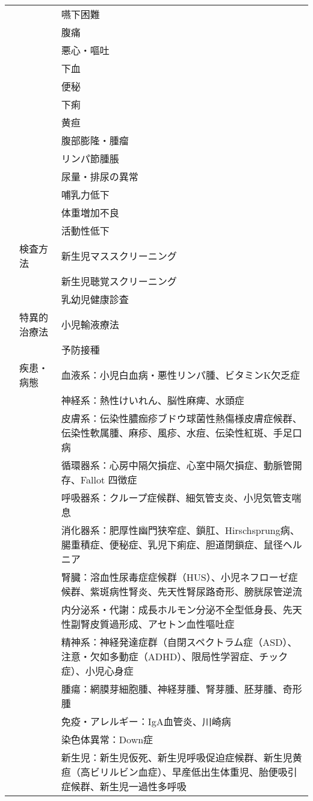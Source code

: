 \documentclass[
]{ltjsarticle}
\begin{document}
\begin{xltabular}{\linewidth}{XXX}
 &  & 嚥下困難 \\
 &  & 腹痛 \\
 &  & 悪心・嘔吐 \\
 &  & 下血 \\
 &  & 便秘 \\
 &  & 下痢 \\
 &  & 黄疸 \\
 &  & 腹部膨隆・腫瘤 \\
 &  & リンパ節腫脹 \\
 &  & 尿量・排尿の異常 \\
 &  & 哺乳力低下 \\
 &  & 体重増加不良 \\
 &  & 活動性低下 \\
 & 検査方法 & 新生児マススクリーニング \\
 &  & 新生児聴覚スクリーニング \\
 &  & 乳幼児健康診査 \\
 & 特異的治療法 & 小児輸液療法 \\
 &  & 予防接種 \\
 & 疾患・病態 & 血液系：小児白血病・悪性リンパ腫、ビタミンK欠乏症 \\
 &  & 神経系：熱性けいれん、脳性麻痺、水頭症 \\
 &  & 皮膚系：伝染性膿痂疹ブドウ球菌性熱傷様皮膚症候群、伝染性軟属腫、麻疹、風疹、水痘、伝染性紅斑、手足口病 \\
 &  & 循環器系：心房中隔欠損症、心室中隔欠損症、動脈管開存、Fallot 四徴症 \\
 &  & 呼吸器系：クループ症候群、細気管支炎、小児気管支喘息 \\
 &  & 消化器系：肥厚性幽門狭窄症、鎖肛、Hirschsprung病、腸重積症、便秘症、乳児下痢症、胆道閉鎖症、鼠径ヘルニア \\
 &  & 腎臓：溶血性尿毒症症候群（HUS）、小児ネフローゼ症候群、紫斑病性腎炎、先天性腎尿路奇形、膀胱尿管逆流 \\
 &  & 内分泌系・代謝：成長ホルモン分泌不全型低身長、先天性副腎皮質過形成、アセトン血性嘔吐症 \\
 &  & 精神系：神経発達症群（自閉スペクトラム症（ASD）、注意・欠如多動症（ADHD）、限局性学習症、チック症）、小児心身症 \\
 &  & 腫瘍：網膜芽細胞腫、神経芽腫、腎芽腫、胚芽腫、奇形腫 \\
 &  & 免疫・アレルギー：IgA血管炎、川崎病 \\
 &  & 染色体異常：Down症 \\
 &  & 新生児：新生児仮死、新生児呼吸促迫症候群、新生児黄疸（高ビリルビン血症）、早産低出生体重児、胎便吸引症候群、新生児一過性多呼吸 \\

\end{xltabular}
\end{document}

